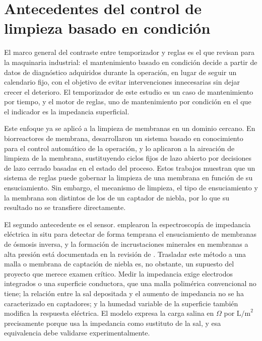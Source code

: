 \section{Antecedentes del control de limpieza basado en condici\'on}
\label{sec:antecedentes}
El marco general del contraste entre temporizador y reglas es el que \textcite{jardine2006review} revisan para la maquinaria industrial: el mantenimiento basado en condici\'on decide a partir de datos de diagn\'ostico adquiridos durante la operaci\'on, en lugar de seguir un calendario fijo, con el objetivo de evitar intervenciones innecesarias sin dejar crecer el deterioro. El temporizador de este estudio es un caso de mantenimiento por tiempo, y el motor de reglas, uno de mantenimiento por condici\'on en el que el indicador es la impedancia superficial.

Este enfoque ya se aplic\'o a la limpieza de membranas en un dominio cercano. En biorreactores de membrana, \textcite{comas2010knowledge} desarrollaron un sistema basado en conocimiento para el control autom\'atico de la operaci\'on, y \textcite{ferrero2011knowledge} lo aplicaron a la aireaci\'on de limpieza de la membrana, sustituyendo ciclos fijos de lazo abierto por decisiones de lazo cerrado basadas en el estado del proceso. Estos trabajos muestran que un sistema de reglas puede gobernar la limpieza de una membrana en funci\'on de su ensuciamiento. Sin embargo, el mecanismo de limpieza, el tipo de ensuciamiento y la membrana son distintos de los de un captador de niebla, por lo que su resultado no se transfiere directamente.

El segundo antecedente es el sensor. \textcite{sim2013detection} emplearon la espectroscop\'ia de impedancia el\'ectrica in situ para detectar de forma temprana el ensuciamiento de membranas de \'osmosis inversa, y la formaci\'on de incrustaciones minerales en membranas a alta presi\'on est\'a documentada en la revisi\'on de \textcite{antony2011scale}. Trasladar este m\'etodo a una malla o membrana de captaci\'on de niebla es, no obstante, un supuesto del proyecto que merece examen cr\'itico. Medir la impedancia exige electrodos integrados o una superficie conductora, que una malla polim\'erica convencional no tiene; la relaci\'on entre la sal depositada y el aumento de impedancia no se ha caracterizado en captadores; y la humedad variable de la superficie tambi\'en modifica la respuesta el\'ectrica. El modelo expresa la carga salina en $\Omega$ por $\text{L/m}^2$ precisamente porque usa la impedancia como sustituto de la sal, y esa equivalencia debe validarse experimentalmente.

